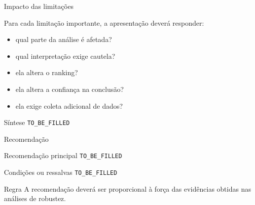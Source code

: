 
\begin{frame}{Impacto das limitações}

    Para cada limitação importante, a apresentação deverá responder:

    \begin{itemize}
        \item qual parte da análise é afetada?
        \item qual interpretação exige cautela?
        \item ela altera o ranking?
        \item ela altera a confiança na conclusão?
        \item ela exige coleta adicional de dados?
    \end{itemize}

    \vspace{0.3cm}

    \begin{block}{Síntese}
        \texttt{TO\_BE\_FILLED}
    \end{block}

\end{frame}



\begin{frame}{Recomendação}

    \begin{block}{Recomendação principal}
        \texttt{TO\_BE\_FILLED}
    \end{block}

    \vspace{0.3cm}

    \begin{block}{Condições ou ressalvas}
        \texttt{TO\_BE\_FILLED}
    \end{block}

    \vspace{0.3cm}

    \begin{alertblock}{Regra}
        A recomendação deverá ser proporcional à força das evidências
        obtidas nas análises de robustez.
    \end{alertblock}

\end{frame}


